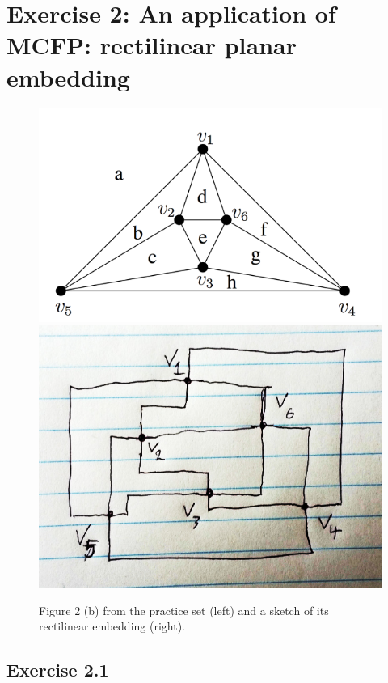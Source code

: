 \section{Exercise 2: An application of MCFP: rectilinear planar embedding}

\begin{figure}
  \label{fig:rect-emb}

  \begin{center}
  \includegraphics[scale=0.3]{img/fig2b.png}
  \includegraphics[scale=0.3]{img/ex21.png}
  \end{center}
  
  \caption{Figure 2 (b) from the practice set (left) and a sketch of its rectilinear embedding (right).}
\end{figure}

\subsection{Exercise 2.1}

